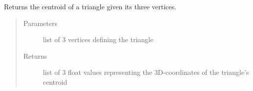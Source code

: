 \documentclass[letterpaper,10pt,english]{sphinxmanual}
\begin{document}
\begin{fulllineitems}
\label{\detokenize{pk_src.misc:pk_src.misc.centroidTriangle}}
Returns the centroid of a triangle given its three vertices.
\begin{quote}\begin{description}
\item[{Parameters}] \leavevmode
{} \textendash{} list of 3 vertices defining the triangle

\item[{Returns}] \leavevmode
list of 3 float values representing the 3D-coordinates of the triangle’s centroid

\end{description}\end{quote}
\begin{description}
\item[{}] \leavevmode
\begin{sphinxVerbatim}[commandchars=\\\{\}]
   
  \PYG{p}{[}\PYG{p}{[}  \PYG{p}{]}    \PYG{p}{]}
\PYG{p}{[}\PYG{p}{[}\PYG{p}{]} \PYG{p}{[}\PYG{p}{]} \PYG{p}{[}\PYG{p}{]}\PYG{p}{]}
\end{sphinxVerbatim}

\end{description}

\end{fulllineitems}

\end{document}
